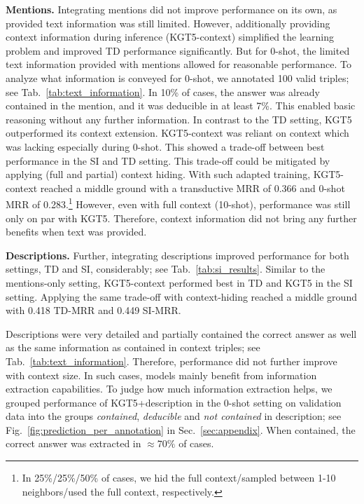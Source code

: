 \documentclass[11pt]{article}
\renewcommand\:{\colon} \newcommand{\sset}[1]{\left\{\,#1\,\right\}} \newcommand{\ssets}[1]{\left\{#1\right\}} \newcommand{\ssetn}[1]{\{\,#1\,\}}
\begin{document}
\textbf{Mentions.}
Integrating mentions did not improve performance on its own, as provided text information was still limited.
However, additionally providing context information during inference (KGT5-context) simplified the learning problem and improved TD performance significantly.
But for 0-shot, the limited text information provided with mentions allowed for reasonable performance.
To analyze what information is conveyed for 0-shot, we annotated 100 valid
triples; see Tab.~\ref{tab:text_information}. In 10\% of cases, the answer was
already contained in the mention, and it was deducible in at least 7\%. This
enabled basic reasoning without any further information. In contrast to the TD
setting, KGT5 outperformed its context extension. KGT5-context was reliant on
context which was lacking especially during 0-shot. This showed a trade-off
between best performance in the SI and TD setting. This trade-off could be
mitigated by applying (full and partial) context hiding. With such adapted
training, KGT5-context reached a middle ground with a transductive MRR of
0.366 and 0-shot MRR of 0.283.\footnote{In 25\%/25\%/50\% of cases, we hid the full
  context/sampled between 1-10 neighbors/used the full
  context, respectively.} However, even with full context (10-shot), performance was still
only on par with KGT5. Therefore, context information did not bring any further
benefits when text was provided.


\textbf{Descriptions.}
Further, integrating descriptions improved performance for both settings, TD and SI, considerably; see Tab.~\ref{tab:si_results}.
Similar to the mentions-only setting, KGT5-context performed best in TD and KGT5 in the SI setting.
Applying the same trade-off with context-hiding reached a middle ground with 0.418 TD-MRR and 0.449 SI-MRR.

Descriptions were very detailed and partially contained the correct answer as
well as the same information as contained in context triples; see
Tab.~\ref{tab:text_information}. Therefore, performance did not further improve
with context size. In such cases, models mainly benefit from information
extraction capabilities. To judge how much information extraction helps, we
grouped performance of KGT5+description in the 0-shot setting on validation data
into the groups \textit{contained}, \textit{deducible} and \textit{not
  contained} in description; see Fig.~\ref{fig:prediction_per_annotation} in
Sec.~\ref{sec:appendix}. When contained, the correct answer was extracted in
$\approx70\%$ of cases.
\end{document}
